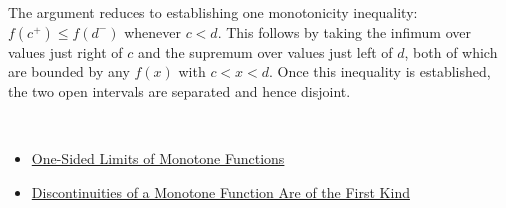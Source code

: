 \begin{remark*}
The argument reduces to establishing one monotonicity inequality: $f(c^{+}) \leq f(d^{-})$ whenever $c < d$. This follows by taking the infimum over values just right of $c$ and the supremum over values just left of $d$, both of which are bounded by any $f(x)$ with $c < x < d$. Once this inequality is established, the two open intervals are separated and hence disjoint.
\end{remark*}

\begin{remark*}[Dependencies]~\\
\begin{itemize}
  \item \hyperref[thm:monotone-one-sided-limits]{One-Sided Limits of Monotone Functions}
  \item \hyperref[prop:monotone-discontinuities-first-kind]{Discontinuities of a Monotone Function Are of the First Kind}
\end{itemize}
\end{remark*}
